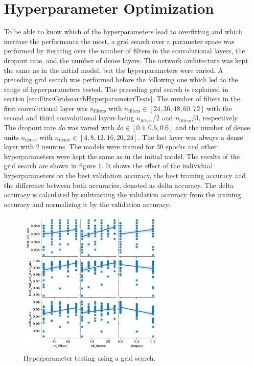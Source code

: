 \section{Hyperparameter Optimization}
\label{sec:hyperparameter}

To be able to know which of the hyperparameters lead to overfitting and which increase the performance the most, a grid search over a parameter space was performed by iterating over the number of filters in the convolutional layers, the dropout rate, and the number of dense layers.
The network architecture was kept the same as in the initial model, but the hyperparameters were varied. 
A preceding grid search was performed before the following one which led to the range of hyperparameters tested.
The preceding grid search is explained in section \ref{sec:FirstGridsearchHyperparameterTests}.
The number of filters in the first convolutional layer was $n_{\text{filters}}$ with $n_{\text{filters}} \in [24, 36, 48, 60, 72]$ with the second and third convolutional layers being $n_{\text{filters}}/2$ and $n_{\text{filters}}/3$, respectively.
The dropout rate $do$ was varied with $do \in [0.4, 0.5, 0.6]$ and the number of dense units $n_{\text{dense}}$ with $n_{\text{dense}} \in [4, 8, 12, 16, 20, 24]$.
The last layer was always a dense layer with 2 neurons.
The models were trained for 30 epochs and other hyperparameters were kept the same as in the initial model. \newline
The results of the grid search are shown in figure \ref{fig:gridsearch}.
It shows the effect of the individual hyperparameters on the best validation accuracy, the best training accuracy and the difference between both accuracies, denoted as delta accuracy.
The delta accuracy is calculated by subtracting the validation accuracy from the training accuracy and normalizing it by the validation accuracy.
\begin{figure}[H]
    \centering
    \includegraphics[width=0.65\textwidth]{plots/pairplot.pdf}
    \caption{Hyperparameter testing using a grid search.}
    \label{fig:gridsearch}
\end{figure}

